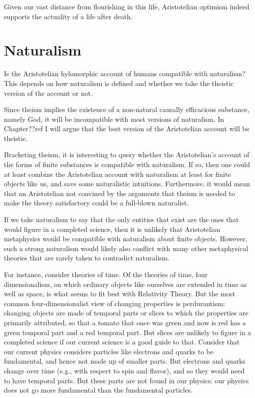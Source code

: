 Given our vast distance from flourishing in this life, Aristotelian optimism indeed supports the actuality of a life
after death.

\section{Naturalism}
Is the Aristotelian hylomorphic account of humans compatible with naturalism? This depends on how naturalism
is defined and whether we take the theistic version of the account or not.

Since theism implies the existence of a non-natural causally efficacious substance, namely God, it will be incompatible
with most versions of naturalism. In Chapter??ref I will argue that the best version of the Aristotelian account
will be theistic.

Bracketing theism, it is interesting to query whether the Aristotelian's account of the forms of finite
substances is compatible with naturalism. If so, then one could at least combine the Aristotelian account with 
naturalism at least for finite objects like us, and save some naturalistic intuitions. Furthermore, it would mean
that an Aristotelian not convined by the arguments that theism is needed to make the theory satisfactory could
be a full-blown naturalist.

If we take naturalism to say that the only entities that exist are the ones that would figure in a completed science,
then it is unlikely that Aristotelian metaphysics would be compatible with naturalism about finite objects. However,
such a strong naturalism would likely also conflict with many other metaphysical theories that are rarely taken to 
contradict naturalism. 

For instance, consider theories of time. Of the theories of time, four dimensionalism, on which
ordinary objects like ourselves are extended in time as well as space, is what seems to fit best with Relativity Theory. 
But the most common four-dimensionalist view of changing properties is perdurantism: changing objects are made of temporal parts or
slices to which the properties are primarily attributed, so that a tomato that once was green and now is red has a green temporal part
and a red temporal part. But slices are unlikely to figure in a completed science if
our current science is a good guide to that. Consider that our current physics considers particles
like electrons and quarks to be fundamental, and hence not made up of smaller parts. But electrons and quarks change over
time (e.g., with respect to spin and flavor), and so they would need to have temporal parts.  But these parts are not found
in our physics: our physics does not go more fundamental than the fundamental particles.

